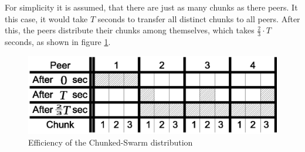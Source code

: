 For simplicity it is assumed, that there are just as many chunks as there peers. It this case, it would take $T$ seconds to transfer all distinct chunks to all peers. After this, the peers distribute their chunks among themselves, which takes $\frac{2}{3} \cdot T$ seconds, as shown in figure \ref{fig:chunkedswarmformula1}.

\begin{figure}[H]
\centering
\includegraphics[width=12cm]{chunkedswarmformula1}
\caption{Efficiency of the Chunked-Swarm distribution}
\label{fig:chunkedswarmformula1}
\end{figure}
